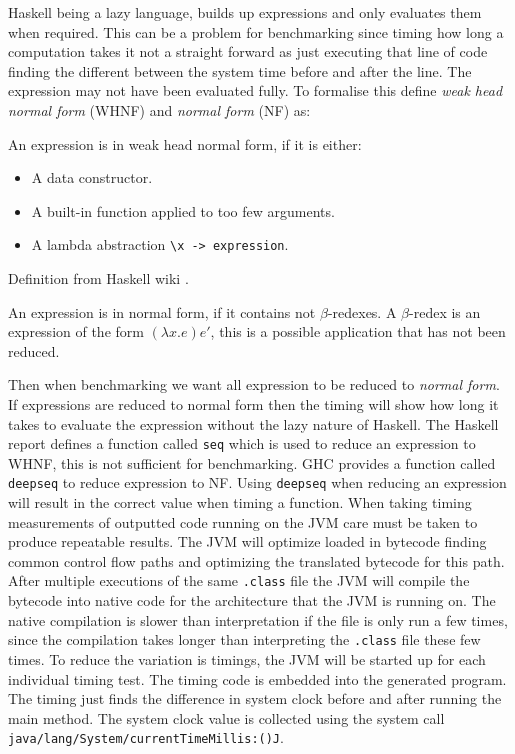 \documentclass[float=false, crop=false]{standalone}
\begin{document}
Haskell being a lazy language, builds up expressions and only
evaluates them when required. 
This can be a problem for benchmarking since timing how long a
computation takes it not a straight forward as just executing that line
of code finding the different between the system time before and after the line.
The expression may not have been evaluated fully. 
To formalise this define \textit{weak head normal form} (WHNF) and 
\textit{normal form} (NF) as:
\begin{displayquote}
  An expression is in weak head normal form, if it is either:
  \begin{itemize}
    \item A data constructor.

    \item A built-in function applied to too few arguments.

    \item A lambda abstraction \verb|\x -> expression|.
  \end{itemize}
\end{displayquote}
  \begin{flushright} 
    Definition from Haskell wiki \cite{haskell-whnf}.
  \end{flushright}
  \begin{displayquote}
    An expression is in normal form, if it contains not $\beta$-redexes. 
    A $\beta$-redex is an expression of the form $(\lambda x.e)e'$, 
    this is a possible application that has not been reduced.
  \end{displayquote}
Then when benchmarking we want all expression to be reduced to \textit{normal form}. If expressions
are reduced to normal form then the timing will show how long it takes to evaluate the expression
without the lazy nature of Haskell. 
The Haskell report defines a function called \verb|seq| which is used to 
reduce an expression to WHNF, this is not sufficient for benchmarking. 
GHC provides a function called \verb|deepseq| to reduce expression to NF.
Using \verb|deepseq| when reducing an expression will result in the 
correct value when timing a function.
When taking timing measurements of outputted code running on the JVM care
must be taken to produce repeatable results. The JVM will optimize loaded
in bytecode finding common control flow paths and optimizing the translated
bytecode for this path. After multiple executions
of the same \verb|.class| file the JVM will compile the bytecode
into native code for the architecture that the JVM is running on. 
The native compilation is slower than interpretation if the file
is only run a few times, since the compilation takes longer than
interpreting the \verb|.class| file these few times.
To reduce the variation is timings, the JVM will be started up for 
each individual timing test. The timing code is embedded into the
generated program. The timing just finds the difference in 
system clock before and after running the main method. The 
system clock value is collected using the system call
\verb|java/lang/System/currentTimeMillis:()J|.
\end{document}
